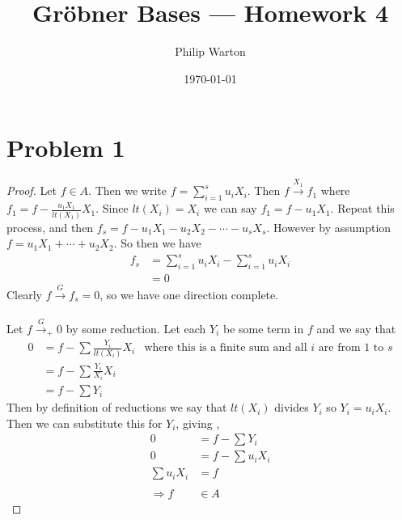 \documentclass{article}
\theoremstyle{definition}
\begin{document}
\title{Gr{\"o}bner Bases --- Homework 4}
\author{Philip Warton}
\date{\today}
\maketitle
\section*{Problem 1}
\begin{proof}
    Let $f \in A$. Then we write $f = \sum_{i=1}^s u_i X_i$.
    Then $f \xrightarrow{X_1} f_1$ where $f_1 = f - \frac{u_1 X_1}{lt(X_1)}X_1$.
    Since $lt(X_i) = X_i$ we can say $f_1 = f - u_1X_1$. Repeat this process,
    and then $f_s = f - u_1X_1 - u_2X_2 - \cdots - u_sX_s$.
    However by assumption $f = u_1X_1 + \cdots + u_2X_2$.
    So then we have 
    \begin{align*}
        f_s &= \sum_{i=1}^s u_iX_i - \sum_{i=1}^su_i X_i \\
        &= 0
    \end{align*}
    Clearly $f \xrightarrow{G} f_s = 0$, so we have one direction complete.\\\\
    Let $f \xrightarrow{G}_+0$ by some reduction. Let each $Y_i$ be some term in $f$
    and we say that 
    \begin{align*}
        0 &= f - \sum \frac{Y_i}{lt(X_i)}X_i & \text{where this is a finite sum and all $i$ are from 1 to $s$}\\
        &= f - \sum \frac{Y_i}{X_i}X_i \\
        &= f - \sum Y_i
    \end{align*}
    Then by definition of reductions we say that $lt(X_i)$ divides $Y_i$ so $Y_i = u_iX_i$.
    Then we can substitute this for $Y_i$, giving ,
    \begin{align*}
        0 &= f - \sum Y_i \\
        0 &= f - \sum u_i X_i \\
        \sum u_i X_i &= f \\\\
        \Rightarrow f &\in A
    \end{align*}
\end{proof}
\end{document}

